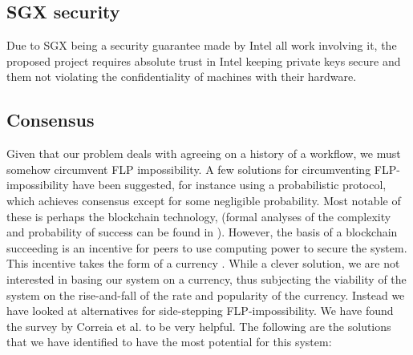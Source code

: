\documentclass{article}
\begin{document}
		\subsection{SGX security}

		Due to SGX being a security guarantee made by Intel all work involving it, the proposed project requires absolute trust in Intel keeping private keys secure and them not violating the confidentiality of machines with their hardware.

		\subsection{Consensus}
		Given that our problem deals with agreeing on a history of a workflow, we must somehow circumvent FLP impossibility.
		A few solutions for circumventing FLP-impossibility have been suggested, for instance using a probabilistic protocol, which achieves consensus except for some negligible probability. Most notable of these is perhaps the blockchain technology, (formal analyses of the complexity and probability of success can be found in \cite{miller2014anonymous}). However, the basis of a blockchain succeeding is an incentive for peers to use computing power to secure the system. This incentive takes the form of a currency \cite{bitcoin-white-paper}. While a clever solution, we are not interested in basing our system on a currency, thus subjecting the viability of the system on the rise-and-fall of the rate and popularity of the currency. Instead we have looked at alternatives for side-stepping FLP-impossibility. We have found the survey by Correia et al. \cite{consensus-survey} to be very helpful. The following are the solutions that we have identified to have the most potential for this system:
\end{document}
